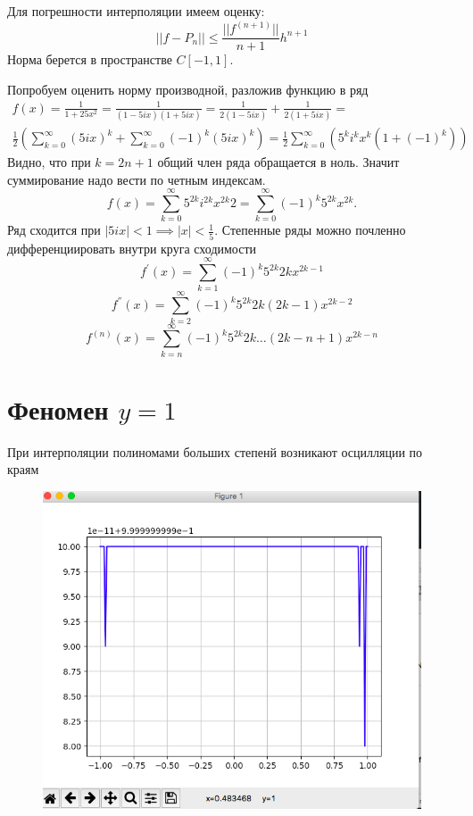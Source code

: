 \documentclass[12pt,a4paper]{article}
\begin{document}
Для погрешности интерполяции имеем оценку:
\begin{equation}
||f - P_n|| \leq \frac{||f^ {(n+1)}||}{n + 1} h^{ n + 1}
\end{equation}
Норма берется в пространстве $C[-1, 1]$.

Попробуем оценить норму производной, разложив функцию в ряд
	\begin{equation}
	\begin{split}
	f(x) = \frac{1}{1 + 25x^2} = \frac{1}{(1-5ix)(1+5ix)} = \frac{1}{2(1-5ix)} + \frac{1}{2(1+5ix)} = \\ \frac{1}{2} (\sum_{k=0}^\infty(5ix)^k + \sum_{k=0}^\infty(-1)^k(5ix)^k) = \frac{1}{2}\sum_{k=0}^\infty(5^k i^k x^k (1 + (-1)^k))
	\end{split}
	\end{equation}
Видно, что при $k = 2n+1$ общий член ряда обращается в ноль. Значит суммирование надо вести по четным индексам.
\begin{equation}
f(x)  = \sum_{k=0}^\infty5^{2k} i^{2k} x^{2k}  2 = \sum_{k=0}^\infty(-1)^k5^{2k} x^{2k}.
\end{equation}
Ряд сходится при $ |5ix|< 1 \implies |x| < \frac{1}{5} $.
Степенные ряды можно почленно дифференциировать внутри круга сходимости
\begin{equation}
f^{ ' }(x) = \sum_{k=1}^\infty (-1)^k 5^{2k} 2k x^{2k-1}
\end{equation}
\begin{equation}
f^{ '' }(x) = \sum_{k=2}^\infty (-1)^k 5^{2k} 2k(2k-1) x^{2k-2}
\end{equation}
\begin{equation}
f^{ (n) }(x) = \sum_{k=n}^\infty (-1)^k 5^{2k} 2k  \ldots (2k - n + 1) x^{2k - n}
\end{equation}
\newpage
\section{Феномен $y = 1$}
При интерполяции полиномами больших степенй возникают осцилляции по краям
\begin{figure}
	\includegraphics[width=\linewidth]{const_func.png}
	\caption{}
	\label{fig:const}
\end{figure} 
\end{document}
